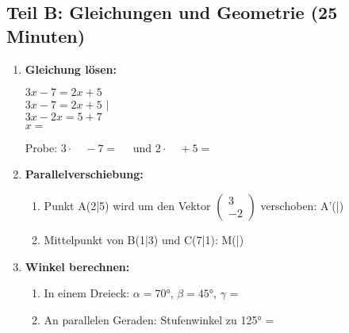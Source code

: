 \subsection*{Teil B: Gleichungen und Geometrie (25 Minuten)}

\begin{enumerate}[label=\arabic*.]

    \item \textbf{Gleichung lösen:}
    \vspace{0.5cm}

    $3x - 7 = 2x + 5$ \\
    $3x - 7 = 2x + 5$ $|\phantom{00}$ \\
    $3x - 2x = 5 + 7$ \\
    $x = \phantom{00}$

    \vspace{0.5cm}
    Probe: $3 \cdot \phantom{00} - 7 = \phantom{00}$ und $2 \cdot \phantom{00} + 5 = \phantom{00}$ \checkmark

    \vspace{1cm}

    \item \textbf{Parallelverschiebung:}
    \vspace{0.5cm}

    \begin{enumerate}[label=\alph*)]
        \item Punkt A(2|5) wird um den Vektor $\begin{pmatrix} 3 \\ -2 \end{pmatrix}$ verschoben:
        A'(\underline{\hspace{1cm}}|\underline{\hspace{1cm}})
        \vspace{0.5cm}

        \item Mittelpunkt von B(1|3) und C(7|1):
        M(\underline{\hspace{1cm}}|\underline{\hspace{1cm}})
    \end{enumerate}

    \vspace{1cm}

    \item \textbf{Winkel berechnen:}
    \vspace{0.5cm}

    \begin{enumerate}[label=\alph*)]
        \item In einem Dreieck: $\alpha = 70°$, $\beta = 45°$, $\gamma$ = \underline{\hspace{2cm}}
        \vspace{0.3cm}

        \item An parallelen Geraden: Stufenwinkel zu 125° = \underline{\hspace{2cm}}
    \end{enumerate}

\end{enumerate}